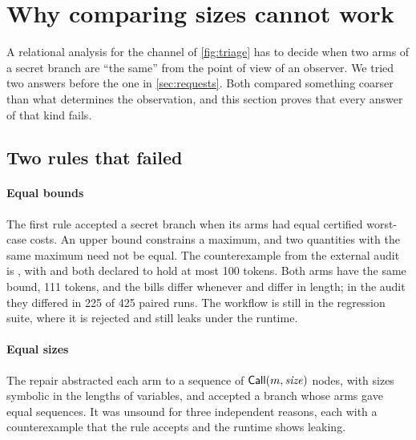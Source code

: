 \section{Why comparing sizes cannot work}\label{sec:sizes}

A relational analysis for the channel of \cref{fig:triage} has to decide when two
arms of a secret branch are ``the same'' from the point of view of an observer. We
tried two answers before the one in \cref{sec:requests}. Both compared something
coarser than what determines the observation, and this section proves that every
answer of that kind fails.

\subsection{Two rules that failed}\label{sec:failed}

\paragraph{Equal bounds} The first rule accepted a secret branch when its arms had
equal certified worst-case costs. An upper bound constrains a maximum, and two
quantities with the same maximum need not be equal. The counterexample from the
external audit is ,
with  and  both declared to hold at most 100 tokens. Both arms have
the same bound, 111 tokens, and the bills differ whenever  and 
differ in length; in the audit they differed in 225 of 425 paired runs. The
workflow is still in the regression suite, where it is rejected and still leaks
under the runtime.

\paragraph{Equal sizes} The repair abstracted each arm to a sequence of
$\mathsf{Call}(m, \mathit{size})$ nodes, with sizes symbolic in the lengths of variables,
and accepted a branch whose arms gave equal sequences. It was unsound for three
independent reasons, each with a counterexample that the rule accepts and the
runtime shows leaking.

